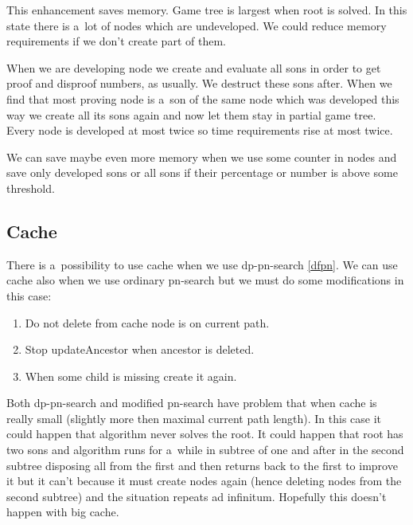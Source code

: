 This enhancement saves memory. Game tree is largest when root is solved.  In
this state there is a~lot of nodes which are undeveloped.  We could reduce memory requirements if we don't create part of
them. 

When we are developing node we create and evaluate all sons in order to get
proof and disproof numbers, as usually. We destruct these sons after. When we
find that most proving node is a~son of the same node which was developed this
way we create all its sons again and now let them stay in partial game tree.
Every node is developed at most twice so time requirements rise at most twice.

We can save maybe even more memory when we use some counter in nodes
and save only developed sons or all sons if their percentage or number is 
above some threshold.

\subsection{Cache }

There is a~possibility to use cache when we use dp-pn-search \ref{dfpn}.
We can use cache also when we use ordinary pn-search but we must
do some modifications in this case: 

\begin{enumerate}
\item Do not delete from cache node is on current path.
\item Stop updateAncestor when ancestor is deleted.
\item When some child is missing create it again.
\end{enumerate}

Both dp-pn-search and modified pn-search have problem that when cache is really small (slightly
more then maximal current path length). In this case it could happen that algorithm
never solves the root. It could happen that root has
two sons and algorithm runs for a~while in subtree of one and after in the second
subtree disposing all from the first and then returns back to the first to improve
it but it can't because it must create nodes again (hence deleting nodes from the
second subtree) and the situation repeats ad infinitum. 
Hopefully this doesn't happen with big cache.

